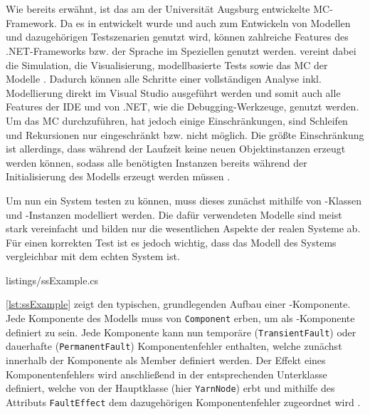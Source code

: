 \section{\sS}\label{sec:sSharp}

Wie bereits erwähnt, ist \sS das am \isse der Universität Augsburg entwickelte \ac{MC}-Framework. Da es in \cS entwickelt wurde und \cS auch zum Entwickeln von Modellen und dazugehörigen Testszenarien genutzt wird, können zahlreiche Features des .NET-Frameworks bzw. der Sprache \cS im Speziellen genutzt werden. \sS vereint dabei die Simulation, die Visualisierung, modellbasierte Tests sowie das MC der Modelle \cite{Habermaier2015,Habermaier2016}. Dadurch können alle Schritte einer vollständigen Analyse inkl. Modellierung direkt im Visual Studio ausgeführt werden und somit auch alle Features der IDE und von .NET, wie \zB die Debugging-Werkzeuge, genutzt werden. Um das \ac{MC} durchzuführen, hat \sS jedoch einige Einschränkungen, \uA sind Schleifen und Rekursionen nur eingeschränkt bzw. nicht möglich. Die größte Einschränkung ist allerdings, dass während der Laufzeit keine neuen Objektinstanzen erzeugt werden können, sodass alle benötigten Instanzen bereits während der Initialisierung des Modells erzeugt werden müssen \cite{Habermaier2015}.

Um nun ein System testen zu können, muss dieses zunächst mithilfe von \cS-Klassen und -Instanzen modelliert werden. Die dafür verwendeten Modelle sind meist stark vereinfacht und bilden nur die wesentlichen Aspekte der realen Systeme ab. Für einen korrekten Test ist es jedoch wichtig, dass das Modell des Systems vergleichbar mit dem echten System ist.


{listings/ssExample.cs}

\autoref{lst:ssExample} zeigt den typischen, grundlegenden Aufbau einer \sS-Komponente. Jede Komponente des Modells muss von \texttt{Component} erben, um als \sS-Komponente definiert zu sein. Jede Komponente kann nun temporäre (\texttt{TransientFault}) oder dauerhafte (\texttt{PermanentFault}) Komponentenfehler enthalten, welche zunächst innerhalb der Komponente als Member definiert werden. Der Effekt eines Komponentenfehlers wird anschließend in der entsprechenden Unterklasse definiert, welche von der Hauptklasse (hier \texttt{YarnNode}) erbt und mithilfe des Attributs \texttt{FaultEffect} dem dazugehörigen Komponentenfehler zugeordnet wird \cite{Habermaier2016}.

